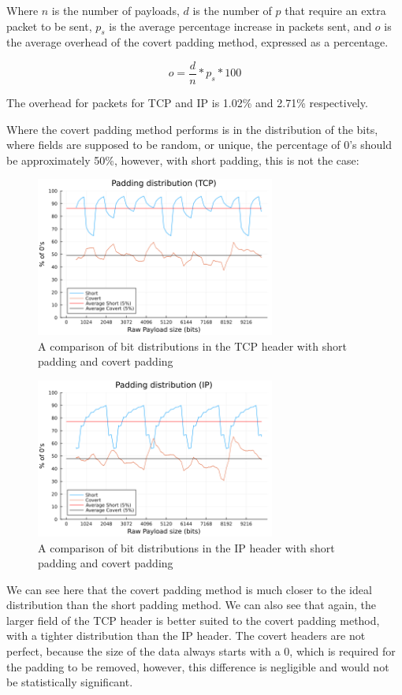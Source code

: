 Where $n$ is the number of payloads, $d$ is the number of $p$ that require an extra packet to be sent, $p_s$ is the average percentage increase in packets sent, and $o$ is the average overhead of the covert padding method, expressed as a percentage.

\begin{equation*}
    o = \frac{d}{n} * p_s * 100
\end{equation*}

The overhead for packets for TCP and IP is 1.02\% and 2.71\% respectively.

Where the covert padding method performs is in the distribution of the bits, where fields are supposed to be random, or unique, the percentage of 0's should be approximately 50\%, however, with short padding, this is not the case:

\begin{figure}[h]
    \centering
    \includegraphics[width=0.7\textwidth]{fig/padding_distribution_TCP.png}
    \caption{A comparison of bit distributions in the TCP header with short padding and covert padding}
    \label{fig:padding_distribution_TCP}
\end{figure}

\begin{figure}[h]
    \centering
    \includegraphics[width=0.7\textwidth]{fig/padding_distribution_IP.png}
    \caption{A comparison of bit distributions in the IP header with short padding and covert padding}
    \label{fig:padding_distribution_IP}
\end{figure}

We can see here that the covert padding method is much closer to the ideal distribution than the short padding method. We can also see that again, the larger field of the TCP header is better suited to the covert padding method, with a tighter distribution than the IP header. The covert headers are not perfect, because the size of the data always starts with a 0, which is required for the padding to be removed, however, this difference is negligible and would not be statistically significant.

